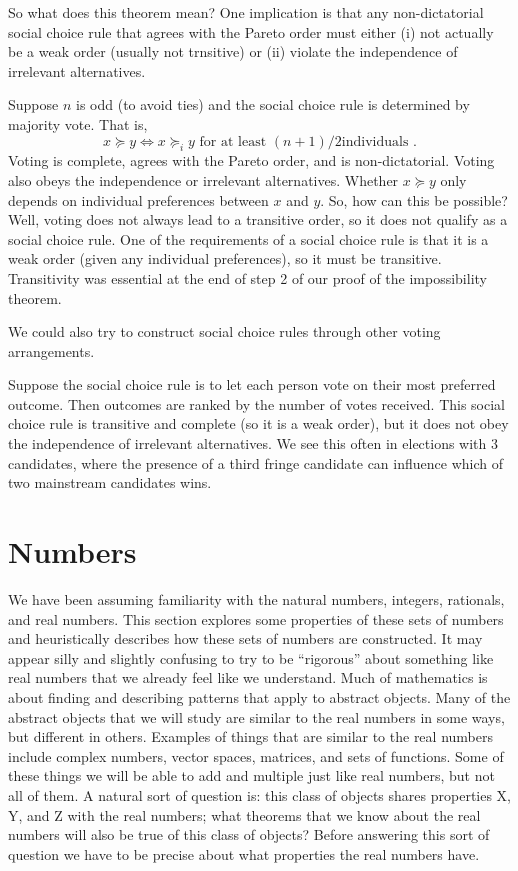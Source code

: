 So what does this theorem mean? One implication is that any
non-dictatorial social choice rule that agrees with the Pareto order
must either (i) not actually be a weak order (usually not trnsitive)
or (ii) violate the independence of irrelevant alternatives.
\begin{example}
  Suppose $n$ is odd (to avoid ties) and the social choice rule is
  determined by majority vote. That is, 
  \[ x \succeq y \iff x \succeq_i y \text{ for at least $(n+1)/2$
    individuals }. \]
  Voting is complete, agrees with the Pareto order, and is
  non-dictatorial. Voting also obeys the independence or irrelevant
  alternatives. Whether $x \succeq y$ only depends on individual
  preferences between $x$ and $y$. So, how can this be possible? Well,
  voting does not always lead to a transitive order, so it does not
  qualify as a social choice rule.  One of the
  requirements of a social choice rule is that it is a weak order
  (given any individual preferences), so it
  must be transitive. Transitivity was essential at the end of step 2
  of our proof of the impossibility theorem.  
\end{example}
We could also try to construct social choice rules through other
voting arrangements. 
\begin{example}
  Suppose the social choice rule is to let each person vote on their
  most preferred outcome. Then outcomes are ranked by the number of
  votes received. This social choice rule is transitive and complete
  (so it is a weak order), but it does not obey the independence of
  irrelevant alternatives. We see this often in elections with 3
  candidates, where the presence of a third fringe candidate can
  influence which of two mainstream candidates wins.
\end{example}



\appendix
\section{Numbers \label{s:numbers}}

We have been assuming familiarity with the natural numbers, integers,
rationals, and real numbers. This section explores some properties of
these sets of numbers and heuristically describes how these sets of
numbers are constructed. It may appear silly and slightly confusing to
try to be ``rigorous'' about something like real numbers that we
already feel like we understand.  Much of mathematics is about finding
and describing patterns that apply to abstract objects. Many of the
abstract objects that we will study are similar to the real numbers in
some ways, but different in others. Examples of things that are
similar to the real numbers include complex numbers, vector spaces,
matrices, and sets of functions. Some of these things we will be able
to add and multiple just like real numbers, but not all of them. A
natural sort of question is: this class of objects shares properties
X, Y, and Z with the real numbers; what theorems that we know about
the real numbers will also be true of this class of objects? Before
answering this sort of question we have to be precise about what
properties the real numbers have.

